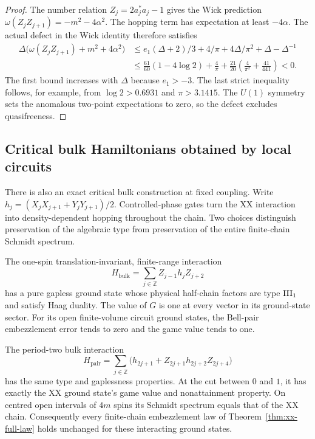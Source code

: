\begin{proof}
The number relation $Z_j=2a_j^*a_j-1$ gives the Wick prediction
$\omega(Z_jZ_{j+1})=-m^2-4\alpha^2$. The hopping term has expectation
at least $-4\alpha$. The actual defect in the Wick identity therefore
satisfies
\begin{align*}
 \Delta\bigl(\omega(Z_jZ_{j+1})+m^2+4\alpha^2\bigr)
 &\le e_1(\Delta+2)/3+4/\pi+4\Delta/\pi^2+\Delta-\Delta^{-1}\\
 &\le \frac{61}{60}(1-4\log2)+\frac4\pi
       +\frac{21}{20}\left(\frac4{\pi^2}+\frac{41}{441}\right)<0.
\end{align*}
The first bound increases with $\Delta$ because $e_1>-3$. The last
strict inequality follows, for example, from $\log2>0.6931$ and
$\pi>3.1415$. The $U(1)$ symmetry sets the anomalous two-point
expectations to zero, so the defect excludes quasifreeness.
\end{proof}

\subsection{Critical bulk Hamiltonians obtained by local circuits}
\label{sec:bulk-circuits}

There is also an exact critical bulk construction at fixed coupling.
Write $h_j=(X_jX_{j+1}+Y_jY_{j+1})/2$. Controlled-phase gates turn
the XX interaction into density-dependent hopping throughout the chain.
Two choices distinguish preservation of the algebraic type from
preservation of the entire finite-chain Schmidt spectrum.

\begin{theorem}\label{thm:bulk-circuit}
The one-spin translation-invariant, finite-range interaction
\[
 H_{\mathrm{bulk}}=\sum_{j\in\mathbb Z}Z_{j-1}h_jZ_{j+2}
\]
has a pure gapless ground state whose physical half-chain factors are
type $\mathrm{III}_1$ and satisfy Haag duality. The value of $G$ is one at
every vector in its ground-state sector. For its open finite-volume
circuit ground states, the Bell-pair embezzlement error tends to zero
and the game value tends to one.

The period-two bulk interaction
\[
 H_{\mathrm{pair}}=\sum_{j\in\mathbb Z}
 \bigl(h_{2j+1}+Z_{2j+1}h_{2j+2}Z_{2j+4}\bigr)
\]
has the same type and gaplessness properties. At the cut between $0$
and $1$, it has exactly the XX ground state's game value and
nonattainment property. On centred open intervals of $4m$ spins its
Schmidt spectrum equals that of the XX chain. Consequently every
finite-chain embezzlement law of Theorem~\ref{thm:xx-full-law} holds
unchanged for these interacting ground states.
\end{theorem}

